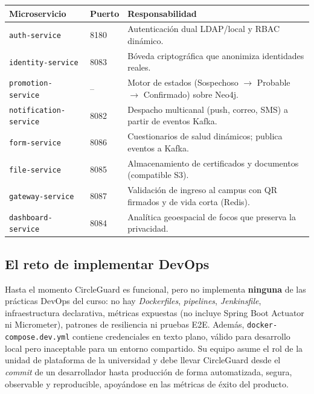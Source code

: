 \documentclass[10pt,letterpaper]{article}
\begin{document}
\vspace{0.06cm}
\noindent\small
\begin{tabularx}{\textwidth}{|L{3.6cm}|L{1.3cm}|X|}
\hline
{}
\textbf{Microservicio} & \textbf{Puerto} & \textbf{Responsabilidad} \\ \hline
\texttt{auth-service} & 8180 & Autenticación dual LDAP/local y RBAC dinámico. \\ \hline
\texttt{identity-service} & 8083 & Bóveda criptográfica que anonimiza identidades reales. \\ \hline
\texttt{promotion-service} & -- & Motor de estados (Sospechoso $\rightarrow$ Probable $\rightarrow$ Confirmado) sobre Neo4j. \\ \hline
\texttt{notification-service} & 8082 & Despacho multicanal (push, correo, SMS) a partir de eventos Kafka. \\ \hline
\texttt{form-service} & 8086 & Cuestionarios de salud dinámicos; publica eventos a Kafka. \\ \hline
\texttt{file-service} & 8085 & Almacenamiento de certificados y documentos (compatible S3). \\ \hline
\texttt{gateway-service} & 8087 & Validación de ingreso al campus con QR firmados y de vida corta (Redis). \\ \hline
\texttt{dashboard-service} & 8084 & Analítica geoespacial de focos que preserva la privacidad. \\ \hline
\end{tabularx}

\subsection{El reto de implementar DevOps}
Hasta el momento CircleGuard es funcional, pero no implementa \textbf{ninguna} de las prácticas DevOps del curso: no hay \textit{Dockerfiles}, \textit{pipelines}, \textit{Jenkinsfile}, infraestructura declarativa, métricas expuestas (no incluye Spring Boot Actuator ni Micrometer), patrones de resiliencia ni pruebas E2E. Además, \texttt{docker-compose.dev.yml} contiene credenciales en texto plano, válido para desarrollo local pero inaceptable para un entorno compartido. Su equipo asume el rol de la unidad de plataforma de la universidad y debe llevar CircleGuard desde el \textit{commit} de un desarrollador hasta producción de forma automatizada, segura, observable y reproducible, apoyándose en las métricas de éxito del producto.
\end{document}
